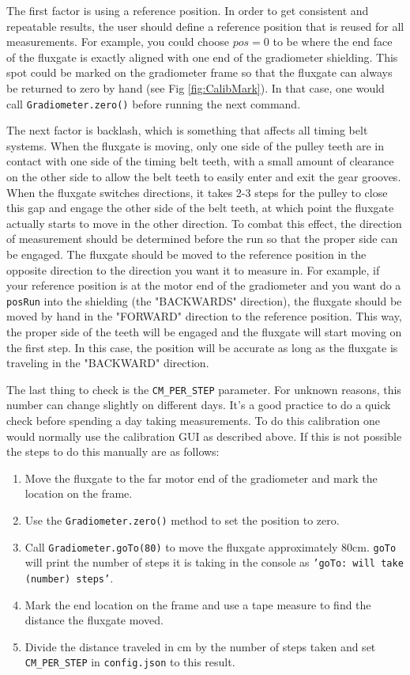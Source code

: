 \documentclass{TheMartianReport}
\newcommand{\pyinline}[1]{\texttt{#1}}
\newcommand{\shellinline}[1]{\texttt{#1}}
\begin{document}
The first factor is using a reference position. In order to get consistent and repeatable results, the user should define a reference position that is reused for all measurements. For example, you could choose $pos=0$ to be where the end face of the fluxgate is exactly aligned with one end of the gradiometer shielding. This spot could be marked on the gradiometer frame so that the fluxgate can always be returned to zero by hand (see Fig \ref{fig:CalibMark}). In that case, one would call \pyinline{Gradiometer.zero()} before running the next command.

The next factor is backlash, which is something that affects all timing belt systems. When the fluxgate is moving, only one side of the pulley teeth are in contact with one side of the timing belt teeth, with a small amount of clearance on the other side to allow the belt teeth to easily enter and exit the gear grooves. When the fluxgate switches directions, it takes 2-3 steps for the pulley to close this gap and engage the other side of the belt teeth, at which point the fluxgate actually starts to move in the other direction. To combat this effect, the direction of measurement should be determined before the run so that the proper side can be engaged. The fluxgate should be moved to the reference position in the opposite direction to the direction you want it to measure in. For example, if your reference position is at the motor end of the gradiometer and you want do a \pyinline{posRun} into the shielding (the "BACKWARDS" direction), the fluxgate should be moved by hand in the "FORWARD" direction to the reference position. This way, the proper side of the teeth will be engaged and the fluxgate will start moving on the first step. In this case, the position will be accurate as long as the fluxgate is traveling in the "BACKWARD" direction.

The last thing to check is the \pyinline{CM_PER_STEP} parameter. For unknown reasons, this number can change slightly on different days. It's a good practice to do a quick check before spending a day taking measurements. To do this calibration one would normally use the calibration GUI as described above. If this is not possible the steps to do this manually are as follows:
\begin{enumerate}
	\item Move the fluxgate to the far motor end of the gradiometer and mark the location on the frame.
	\item Use the \pyinline{Gradiometer.zero()} method to set the position to zero.
	\item Call \pyinline{Gradiometer.goTo(80)} to move the fluxgate approximately 80cm. \pyinline{goTo} will print the number of steps it is taking in the console as \shellinline{'goTo: will take (number) steps'}.
	\item Mark the end location on the frame and use a tape measure to find the distance the fluxgate moved.
	\item Divide the distance traveled in cm by the number of steps taken and set \pyinline{CM_PER_STEP} in \shellinline{config.json} to this result.
\end{enumerate}
\end{document}

